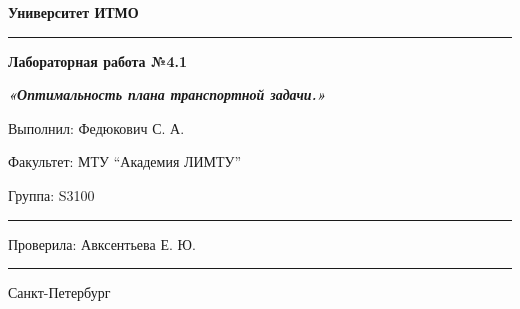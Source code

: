 \documentclass[12pt]{article}
\begin{document}
\pagestyle{empty}
\begin{center}
\large{\textbf{Университет ИТМО}}
\end{center}
\rule{525pt}{1pt}
\par\bigskip\par\bigskip\par\bigskip\par\bigskip\par\bigskip\par\bigskip\par\bigskip\par\bigskip
\begin{center}
\Large
\textbf{Лабораторная работа №4.1}

\textbf{\textit{«Оптимальность плана транспортной задачи.»}}


\end{center}
\par\bigskip\par\bigskip\par\bigskip\par\bigskip\par\bigskip\par\bigskip\par\bigskip\par\bigskip\par\bigskip\par\bigskip\par\bigskip\par\bigskip\par\bigskip\par\bigskip      
\begin{flushright}
\large
Выполнил: Федюкович С. А.
\par\bigskip
Факультет: МТУ “Академия ЛИМТУ”
\par\bigskip
Группа: S3100                       
\par\bigskip\par\bigskip\par\bigskip

\rule{150pt}{0.5pt}
\par\bigskip\par\bigskip\par\bigskip\par\bigskip                                                            
 Проверила: Авксентьева Е. Ю.
\par\bigskip \par\bigskip

\rule{150pt}{0.5pt}
\end{flushright}
\par\bigskip\par\bigskip\par\bigskip\par\bigskip\par\bigskip\par\bigskip\par\bigskip\par\bigskip\par\bigskip\par\bigskip     
\begin{center}
\large
Санкт-Петербург
\par{}
\end{center}
\newpage
\end{document}
